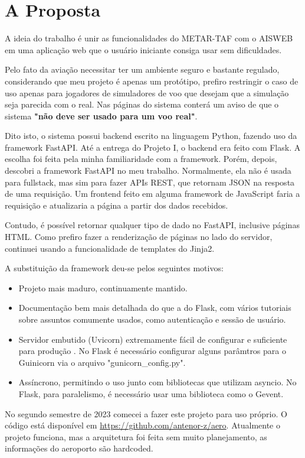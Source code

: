 \chapter{A Proposta}
A ideia do trabalho é unir as funcionalidades do METAR-TAF com o AISWEB
em uma aplicação web que o usuário iniciante consiga usar sem dificuldades.

Pelo fato da aviação necessitar ter um ambiente seguro e bastante regulado, considerando
que meu projeto é apenas um protótipo, prefiro restringir o caso de uso apenas
para jogadores de simuladores de voo que desejam que a simulação seja parecida
com o real. Nas páginas do sistema conterá um aviso de que o sistema \textbf{"não
deve ser usado para um voo real"}.

Dito isto, o sistema possui backend escrito na linguagem Python, fazendo uso da 
framework FastAPI. Até a entrega do Projeto I, o backend era feito com Flask. 
A escolha foi feita pela minha familiaridade com a framework. Porém, depois, 
descobri a framework FastAPI no meu trabalho. Normalmente, ela não é usada para fullstack, mas 
sim para fazer APIs REST, que retornam JSON na resposta de uma requisição. Um 
frontend feito em alguma framework de JavaScript faria a requisição e atualizaria a página
a partir dos dados recebidos.

Contudo, é possível retornar qualquer tipo de dado no FastAPI, inclusive páginas HTML. 
Como prefiro fazer a renderização de páginas no lado do servidor, continuei usando 
a funcionalidade de templates do Jinja2.

A substituição da framework deu-se pelos seguintes motivos:

\begin{itemize}
\item Projeto mais maduro, continuamente mantido.
\item Documentação bem mais detalhada do que a do Flask, com vários tutoriais sobre assuntos comumente usados, como autenticação e sessão de usuário.
\item Servidor embutido (Uvicorn) extremamente fácil de configurar e suficiente para produção \cite{fast-api-prod}.
No Flask é necessário configurar alguns parâmtros para o Guinicorn via o arquivo "gunicorn\_config.py".
\item Assíncrono, permitindo o uso junto com bibliotecas que utilizam asyncio.
No Flask, para paralelismo, é necessário usar uma biblioteca como o Gevent.
\end{itemize}

No segundo semestre de 2023 comecei a fazer este projeto para uso próprio.
O código está disponível em \url{https://github.com/antenor-z/aero}. Atualmente o
projeto funciona, mas a arquitetura foi feita sem muito planejamento, as
informações do aeroporto são hardcoded.

